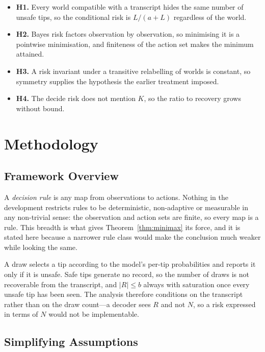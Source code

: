 \documentclass[conference]{IEEEtran}
\theoremstyle{definition}
\begin{document}
\begin{itemize}
\item \textbf{H1.} Every world compatible with a transcript hides the same number of unsafe
tips, so the conditional risk is $L/(a+L)$ regardless of the world.
\item \textbf{H2.} Bayes risk factors observation by observation, so minimising it is a
pointwise minimisation, and finiteness of the action set makes the minimum attained.
\item \textbf{H3.} A risk invariant under a transitive relabelling of worlds is constant, so
symmetry supplies the hypothesis the earlier treatment imposed.
\item \textbf{H4.} The decide risk does not mention $K$, so the ratio to recovery grows
without bound.
\end{itemize}

\section{Methodology}
\label{sec:setting}

\subsection{Framework Overview}

A \emph{decision rule} is any map from observations to actions. Nothing in the development
restricts rules to be deterministic, non-adaptive or measurable in any non-trivial sense: the
observation and action sets are finite, so every map is a rule. This breadth is what gives
Theorem~\ref{thm:minimax} its force, and it is stated here because a narrower rule class would
make the conclusion much weaker while looking the same.

A draw selects a tip according to the model's per-tip probabilities and reports it only if it
is unsafe. Safe tips generate no record, so the number of draws is not recoverable from the
transcript, and $|R|\le b$ always with saturation once every unsafe tip has been seen. The
analysis therefore conditions on the transcript rather than on the draw count---a decoder sees
$R$ and not $N$, so a risk expressed in terms of $N$ would not be implementable.

\subsection{Simplifying Assumptions}
\end{document}
